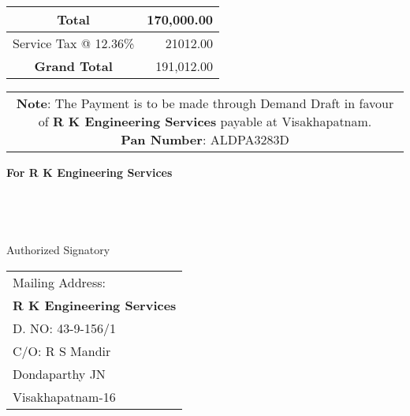 \documentclass[11pt]{article}
\begin{document}
\vspace*{10pt}

\hspace*{11.8cm}
\begin{tabular}{|c|r|}
\hline
Total & 170,000.00 \\
\hline
Service Tax @ 12.36\% & 21012.00 \\
\hline
{\bf Grand Total} & 191,012.00 \\
\hline
\end{tabular}

\vspace*{-1.2cm}
\noindent\begin{tabular}{c}
\parbox{4in}{ {\bf Note}: The Payment is to be made through Demand Draft in favour of {\bf R K Engineering Services} payable at Visakhapatnam. \\
{\noindent \bf Pan Number}:  ALDPA3283D }\\
\end{tabular}
\vspace*{100pt}


{\bf For  R K Engineering Services } \\ \\ \\ \\ \\
 \hspace*{0.6cm}Authorized Signatory
\vspace*{-71pt}
\begin{flushright}
\begin{tabular}{l}
Mailing Address:\\
{\bf R K Engineering Services}\\
D. NO: 43-9-156/1\\
C/O: R S Mandir\\
Dondaparthy JN\\ 
Visakhapatnam-16\\
\end{tabular}
\end{flushright}
\end{document}
